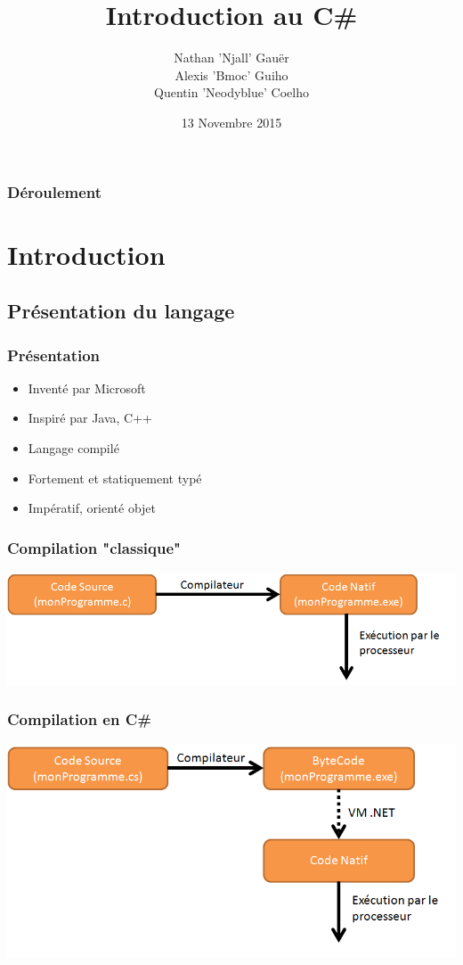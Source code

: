 \documentclass{beamer}
\title[Introduction au C\#]{Introduction au C\#}
\author[]{
Nathan 'Njall' Gauër\\
Alexis 'Bmoc' Guiho\\
Quentin 'Neodyblue' Coelho
}
\institute[GConfs]
{
GConfs
\medskip
}
\date{13 Novembre 2015}
\begin{document}
\begin{frame}
\titlepage
\end{frame}

\begin{frame}
\frametitle{Déroulement}
\tableofcontents
\end{frame}

\section{Introduction}

\subsection{Présentation du langage}

\begin{frame}
\frametitle{Présentation}
\begin{itemize}
\item Inventé par Microsoft
\item Inspiré par Java, C++
\pause
\item Langage compilé
\pause
\item Fortement et statiquement typé
\pause
\item Impératif, orienté objet
\end{itemize}
\end{frame}

\begin{frame}
\frametitle{Compilation "classique"}
\includegraphics[scale=0.50]{img/comp_nat.png}
\end{frame}

\begin{frame}
\frametitle{Compilation en C\#}
\includegraphics[scale=0.40]{img/comp_bc.png}
\end{frame}
\end{document}
